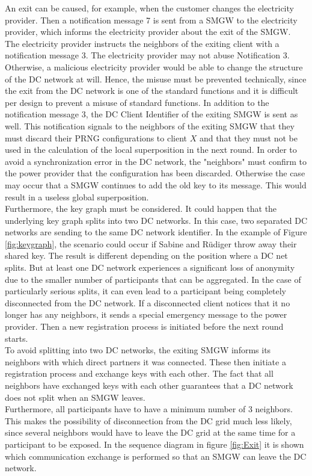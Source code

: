 An exit can be caused, for example, when the customer changes the electricity provider. Then a notification message 7 is sent from a \gls{SMGW} to the electricity provider, which informs the electricity provider about the exit of the \gls{SMGW}. The electricity provider instructs the neighbors of the exiting client with a notification message 3. The electricity provider may not abuse Notification 3. Otherwise, a malicious electricity provider would be able to change the structure of the DC network at will. Hence, the misuse must be prevented technically, since the exit from the DC network is one of the standard functions and it is difficult per design to prevent a misuse of standard functions. In addition to the notification message 3, the DC Client Identifier of the exiting \gls{SMGW} is sent as well. This notification signals to the neighbors of the exiting \gls{SMGW} that they must discard their \gls{PRNG} configurations to client $X$ and that they must not be used in the calculation of the local superposition in the next round. In order to avoid a synchronization error in the DC network, the "neighbors" must confirm to the power provider that the configuration has been discarded. Otherwise the case may occur that a \gls{SMGW} continues to add the old key to its message. This would result in a useless global superposition.\\ Furthermore, the key graph must be considered. It could happen that the underlying key graph splits into two DC networks. In this case, two separated DC networks are sending to the same DC network identifier. In the example of Figure \ref{fig:keygraph}, the scenario could occur if Sabine and Rüdiger throw away their shared key. The result is different depending on the position where a DC net splits. But at least one DC network experiences a significant loss of anonymity due to the smaller number of participants that can be aggregated. In the case of particularly serious splits, it can even lead to a participant being completely disconnected from the DC network. If a disconnected client notices that it no longer has any neighbors, it sends a special emergency message to the power provider. Then a new registration process is initiated before the next round starts.\\ To avoid splitting into two DC networks, the exiting \gls{SMGW} informs its neighbors with which direct partners it was connected. These then initiate a registration process and exchange keys with each other. The fact that all neighbors have exchanged keys with each other guarantees that a DC network does not split when an \gls{SMGW} leaves.\\ Furthermore, all participants have to have a minimum number of 3 neighbors. This makes the possibility of disconnection from the DC grid much less likely, since several neighbors would have to leave the DC grid at the same time for a participant to be exposed. In the sequence diagram in figure \ref{fig:Exit} it is shown which communication exchange is performed so that an \gls{SMGW} can leave the DC network.
